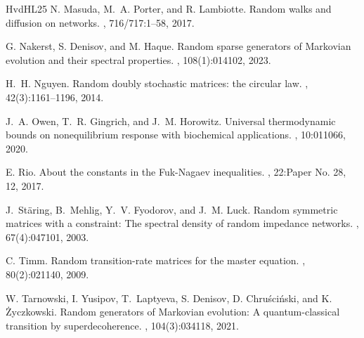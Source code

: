 \documentclass[12pt]{amsart}
\DeclareMathOperator{\1}{\mathbf{1}}
\begin{document}
\begin{thebibliography}{HvdHL25}
N. Masuda, M.~A. Porter, and R. Lambiotte.
\newblock Random walks and diffusion on networks.
, 716/717:1--58, 2017.

G. Nakerst, S. Denisov, and M. Haque.
\newblock Random sparse generators of {M}arkovian evolution and their spectral properties.
, 108(1):014102, 2023.

H.~H. Nguyen.
\newblock Random doubly stochastic matrices: the circular law.
, 42(3):1161--1196, 2014.

J.~A. Owen, T.~R. Gingrich, and J.~M. Horowitz.
\newblock Universal thermodynamic bounds on nonequilibrium response with biochemical applications.
, 10:011066, 2020.

E. Rio.
\newblock About the constants in the {F}uk-{N}agaev inequalities.
, 22:Paper No. 28, 12, 2017.

J.~St{\"a}ring, B.~Mehlig, Y.~V. Fyodorov, and J.~M. Luck.
\newblock Random symmetric matrices with a constraint: The spectral density of random impedance networks.
, 67(4):047101, 2003.

C. Timm.
\newblock Random transition-rate matrices for the master equation.
, 80(2):021140, 2009.

W. Tarnowski, I. Yusipov, T.~Laptyeva, S. Denisov, D. Chru{\'s}ci{\'n}ski, and K. {\.Z}yczkowski.
\newblock Random generators of {M}arkovian evolution: A quantum-classical transition by superdecoherence.
, 104(3):034118, 2021.

\end{thebibliography}

\end{document}
